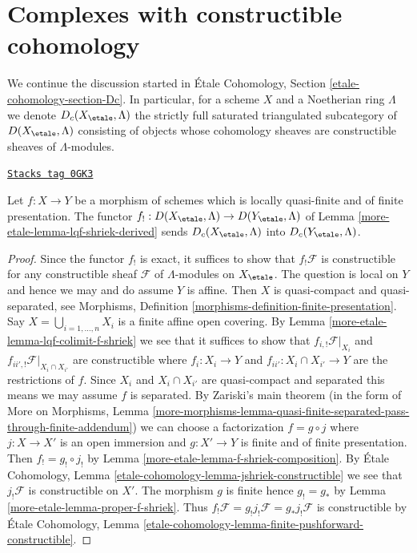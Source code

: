 \section{Complexes with constructible cohomology}
\label{more-etale-section-Dc}
We continue the discussion started in \'Etale Cohomology, Section
\ref{etale-cohomology-section-Dc}. In particular, for a scheme
$X$ and a Noetherian ring $\Lambda$ we denote
$D_c(X_\etale, \Lambda)$ the strictly full saturated triangulated
subcategory of $D(X_\etale, \Lambda)$ consisting of objects
whose cohomology sheaves are constructible sheaves of $\Lambda$-modules.

\begin{lemma}
\label{more-etale-lemma-qf-f-shriek-constructible}
\href{https://stacks.math.columbia.edu/tag/0GK3}{\texttt{Stacks tag 0GK3}}

Let $f : X \to Y$ be a morphism of schemes which is
locally quasi-finite and of finite presentation.
The functor $f_! : D(X_\etale, \Lambda) \to D(Y_\etale, \Lambda)$
of Lemma \ref{more-etale-lemma-lqf-shriek-derived}
sends $D_c(X_\etale, \Lambda)$ into $D_c(Y_\etale, \Lambda)$.
\end{lemma}

\begin{proof}
Since the functor $f_!$ is exact, it suffices to show that
$f_!\mathcal{F}$ is constructible for any constructible sheaf
$\mathcal{F}$ of $\Lambda$-modules on $X_\etale$.
The question is local on $Y$ and hence
we may and do assume $Y$ is affine.
Then $X$ is quasi-compact and quasi-separated, see
Morphisms, Definition \ref{morphisms-definition-finite-presentation}.
Say $X = \bigcup_{i = 1, \ldots, n} X_i$ is a finite affine open
covering. By Lemma \ref{more-etale-lemma-lqf-colimit-f-shriek}
we see that it suffices to show that
$f_{i, !}\mathcal{F}|_{X_i}$ and $f_{ii', !}\mathcal{F}|_{X_i \cap X_{i'}}$
are constructible where $f_i : X_i \to Y$ and
$f_{ii'} : X_i \cap X_{i'} \to Y$ are the restrictions of $f$.
Since $X_i$ and $X_i \cap X_{i'}$ are quasi-compact and separated
this means we may assume $f$ is separated.
By Zariski's main theorem (in the form of
More on Morphisms, Lemma
\ref{more-morphisms-lemma-quasi-finite-separated-pass-through-finite-addendum})
we can choose a factorization $f = g \circ j$ where
$j : X \to X'$ is an open immersion and $g : X' \to Y$ is
finite and of finite presentation. Then $f_! = g_! \circ j_!$ by
Lemma \ref{more-etale-lemma-f-shriek-composition}.
By \'Etale Cohomology, Lemma \ref{etale-cohomology-lemma-jshriek-constructible}
we see that $j_!\mathcal{F}$ is constructible on $X'$.
The morphism $g$ is finite hence $g_! = g_*$
by Lemma \ref{more-etale-lemma-proper-f-shriek}.
Thus $f_!\mathcal{F} = g_!j_!\mathcal{F} = g_*j_!\mathcal{F}$
is constructible by
\'Etale Cohomology, Lemma
\ref{etale-cohomology-lemma-finite-pushforward-constructible}.
\end{proof}


